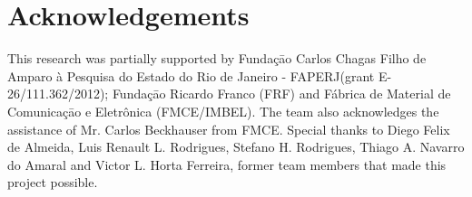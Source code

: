 \section*{Acknowledgements}

This research was partially supported by Funda\c c\={a}o Carlos Chagas Filho de
Amparo \`{a} Pesquisa do Estado do Rio de Janeiro - FAPERJ(grant
E-26/111.362/2012); Funda\c c\={a}o Ricardo Franco (FRF) and F\'{a}brica de
Material de Comunica\c c\={a}o e Eletr\^{o}nica (FMCE/IMBEL). The team also
acknowledges the assistance of Mr. Carlos Beckhauser from FMCE\@. Special thanks
to Diego Felix de Almeida, Luis Renault L. Rodrigues, Stefano H. Rodrigues,
Thiago A. Navarro do Amaral and Victor L. Horta Ferreira, former team members
that made this project possible.

